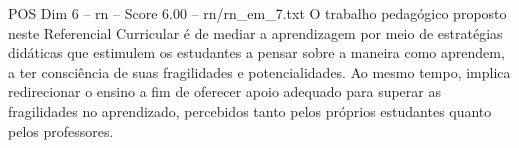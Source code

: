 \begin{textsample}{POS Dim 6 – rn – Score 6.00 – rn/rn\_em\_7.txt}
O trabalho pedagógico proposto neste Referencial Curricular é de mediar a aprendizagem por meio de estratégias didáticas que estimulem os estudantes a pensar sobre a maneira como aprendem, a ter consciência de suas fragilidades e potencialidades.
Ao mesmo tempo, implica redirecionar o ensino a fim de oferecer apoio adequado para superar as fragilidades no aprendizado, percebidos tanto pelos próprios estudantes quanto pelos professores.

\end{textsample}
